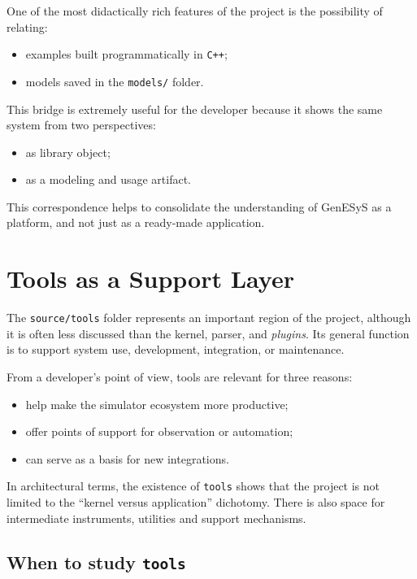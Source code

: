 One of the most didactically rich features of the project is the possibility of relating:
\begin{itemize}
 \item examples built programmatically in \texttt{C++};
 \item models saved in the \texttt{models/} folder.
\end{itemize}

This bridge is extremely useful for the developer because it shows the same system from two perspectives:
\begin{itemize}
 \item as library object;
 \item as a modeling and usage artifact.
\end{itemize}

This correspondence helps to consolidate the understanding of GenESyS as a platform, and not just as a ready-made application.

\section{Tools as a Support Layer}
\label{sec:cap10_tools_como_camada_apoio}

The \texttt{source/tools} folder represents an important region of the project, although it is often less discussed than the kernel, parser, and \textit{plugins}. Its general function is to support system use, development, integration, or maintenance.

From a developer's point of view, tools are relevant for three reasons:
\begin{itemize}
 \item help make the simulator ecosystem more productive;
 \item offer points of support for observation or automation;
 \item can serve as a basis for new integrations.
\end{itemize}

In architectural terms, the existence of \texttt{tools} shows that the project is not limited to the ``kernel versus application'' dichotomy. There is also space for intermediate instruments, utilities and support mechanisms.

\subsection{When to study \texttt{tools}}
\label{subsec:cap10_quando_estudar_tools}

